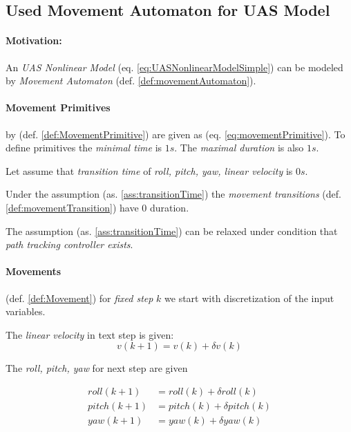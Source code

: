 \subsection{Used Movement Automaton for UAS Model}\label{s:movementAutomatonDefinition}

\paragraph{Motivation:} An \emph{UAS Nonlinear Model} (eq. \ref{eq:UASNonlinearModelSimple}) can be modeled by \emph{Movement Automaton} (def. \ref{def:movementAutomaton}). 

\paragraph{Movement Primitives} by (def. \ref{def:MovementPrimitive})  are given as (eq. \ref{eq:movementPrimitive}). To define primitives the \emph{minimal time} is $1 s$. The \emph{maximal duration} is also $1s$. 

\begin{assumption}\label{ass:transitionTime}
    Let assume that \emph{transition time} of \emph{roll, pitch, yaw, linear velocity} is $0 s$.
\end{assumption}

Under the assumption (as. \ref{ass:transitionTime}) the \emph{movement transitions} (def. \ref{def:movementTransition}) have $0$ duration.

\begin{note}
    The assumption (as. \ref{ass:transitionTime}) can be relaxed under condition that \emph{path tracking controller exists}.
\end{note}

\paragraph{Movements} (def. \ref{def:Movement}) for \emph{fixed step} $k$ we start with discretization of the input variables.

\noindent The \emph{linear velocity} in text step is given:
\begin{equation}\label{eq:applyMovement}
    v(k+1) = v(k) +\delta v(k)
\end{equation}

\noindent The \emph{roll, pitch, yaw} for next step are given 

\begin{equation}\label{eq:applyMovement1}
    \begin{aligned}
        roll(k+1)  &= roll(k) + \delta roll(k)\\
        pitch(k+1) & = pitch(k) + \delta pitch(k)\\
        yaw(k+1) & = yaw(k) + \delta yaw(k)\\
    \end{aligned}    
\end{equation}


